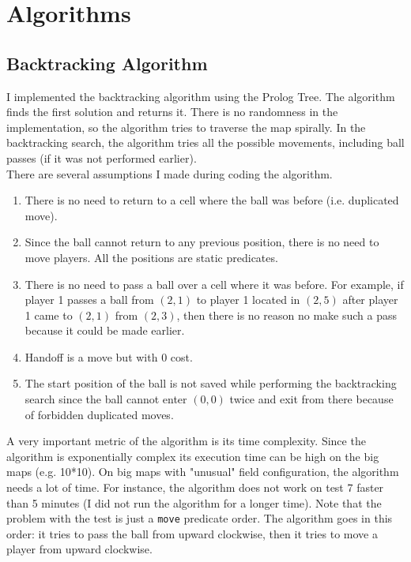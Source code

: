 \documentclass{article}
\begin{document}
\section{Algorithms}
\subsection{Backtracking Algorithm}
I implemented the backtracking algorithm using the Prolog Tree. The algorithm finds the first solution and returns it. There is no randomness in the implementation, so the algorithm tries to traverse the map spirally. In the backtracking search, the algorithm tries all the possible movements, including ball passes (if it was not performed earlier).\\
There are several assumptions I made during coding the algorithm.
\begin{enumerate}
	\item There is no need to return to a cell where the ball was before (i.e. duplicated move).
	\item Since the ball cannot return to any previous position, there is no need to move players. All the positions are static predicates.
	\item There is no need to pass a ball over a cell where it was before. For example, if player 1 passes a ball from $(2, 1)$ to player 1 located in $(2, 5)$ after player 1 came to $(2, 1)$ from $(2, 3)$, then there is no reason no make such a pass because it could be made earlier.
	\item Handoff is a move but with 0 cost.
	\item The start position of the ball is not saved while performing the backtracking search since the ball cannot enter $(0, 0)$ twice and exit from there because of forbidden duplicated moves.
\end{enumerate}
A very important metric of the algorithm is its time complexity. Since the algorithm is exponentially complex its execution time can be high on the big maps (e.g. 10*10). On big maps with "unusual" field configuration, the algorithm needs a lot of time. For instance, the algorithm does not work on test 7 faster than 5 minutes (I did not run the algorithm for a longer time). Note that the problem with the test is just a \texttt{move} predicate order. The algorithm goes in this order: it tries to pass the ball from upward clockwise, then it tries to move a player from upward clockwise.
\end{document}
